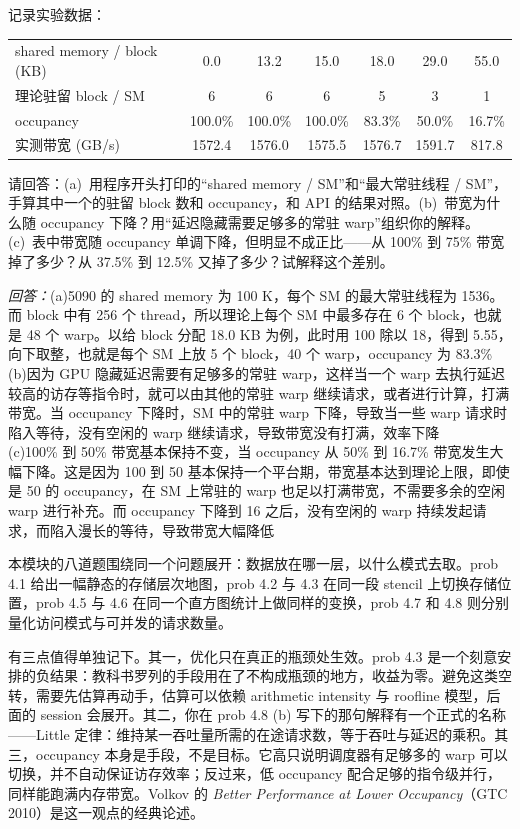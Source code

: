 \documentclass[11pt,a4paper,fontset=none]{ctexart}
\begin{document}
记录实验数据：

\begin{center}\small
\begin{tabular}{@{}lcccccc@{}}
\toprule
shared memory / block (KB) & 0.0 & 13.2 & 15.0 & 18.0 & 29.0 & 55.0\\
理论驻留 block / SM & 6 & 6 & 6 & 5 & 3 & 1\\
occupancy & 100.0\% & 100.0\% & 100.0\% & 83.3\% & 50.0\% & 16.7\%\\
实测带宽 (GB/s) & 1572.4 & 1576.0 & 1575.5 & 1576.7 & 1591.7 & 817.8 \\
\bottomrule
\end{tabular}
\end{center}

请回答：(a)~用程序开头打印的“shared memory / SM”和“最大常驻线程 / SM”，手算其中一个的驻留 block 数和 occupancy，和 API 的结果对照。(b)~带宽为什么随 occupancy 下降？用“延迟隐藏需要足够多的常驻 warp”组织你的解释。(c)~表中带宽随 occupancy 单调下降，但明显不成正比——从 100\% 到 75\% 带宽掉了多少？从 37.5\% 到 12.5\% 又掉了多少？试解释这个差别。
\par\noindent\textit{回答：}(a)5090 的 shared memory 为 100 K，每个 SM 的最大常驻线程为 1536。而 block 中有 256 个 thread，所以理论上每个 SM 中最多存在 6 个 block，也就是 48 个 warp。以给 block 分配 18.0 KB 为例，此时用 100 除以 18，得到 5.55，向下取整，也就是每个 SM 上放 5 个 block，40 个 warp，occupancy 为 83.3\% \\
(b)因为 GPU 隐藏延迟需要有足够多的常驻 warp，这样当一个 warp 去执行延迟较高的访存等指令时，就可以由其他的常驻 warp 继续请求，或者进行计算，打满带宽。当 occupancy 下降时，SM 中的常驻 warp 下降，导致当一些 warp 请求时陷入等待，没有空闲的 warp 继续请求，导致带宽没有打满，效率下降\\
(c)100\% 到 50\% 带宽基本保持不变，当 occupancy 从 50\% 到 16.7\% 带宽发生大幅下降。这是因为 100 到 50 基本保持一个平台期，带宽基本达到理论上限，即使是 50 的 occupancy，在 SM 上常驻的 warp 也足以打满带宽，不需要多余的空闲 warp 进行补充。而 occupancy 下降到 16 之后，没有空闲的 warp 持续发起请求，而陷入漫长的等待，导致带宽大幅降低\\

\begin{lookback}
本模块的八道题围绕同一个问题展开：数据放在哪一层，以什么模式去取。prob 4.1 给出一幅静态的存储层次地图，prob 4.2 与 4.3 在同一段 stencil 上切换存储位置，prob 4.5 与 4.6 在同一个直方图统计上做同样的变换，prob 4.7 和 4.8 则分别量化访问模式与可并发的请求数量。

有三点值得单独记下。其一，优化只在真正的瓶颈处生效。prob 4.3 是一个刻意安排的负结果：教科书罗列的手段用在了不构成瓶颈的地方，收益为零。避免这类空转，需要先估算再动手，估算可以依赖 arithmetic intensity 与 roofline 模型，后面的 session 会展开。其二，你在 prob 4.8 (b) 写下的那句解释有一个正式的名称——Little 定律：维持某一吞吐量所需的在途请求数，等于吞吐与延迟的乘积。其三，occupancy 本身是手段，不是目标。它高只说明调度器有足够多的 warp 可以切换，并不自动保证访存效率；反过来，低 occupancy 配合足够的指令级并行，同样能跑满内存带宽。Volkov 的 \textit{Better Performance at Lower Occupancy}（GTC 2010）是这一观点的经典论述。
\end{lookback}
\end{document}
